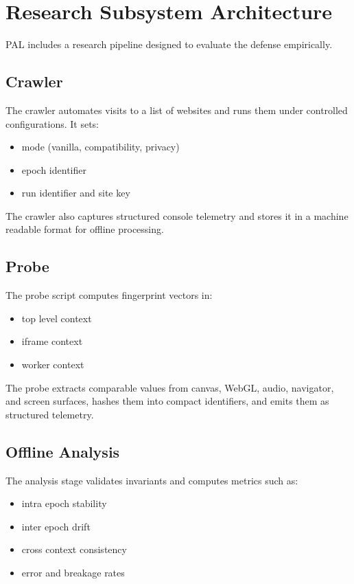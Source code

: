 \documentclass[11pt]{report}
\begin{document}
\section{Research Subsystem Architecture}

PAL includes a research pipeline designed to evaluate the defense empirically.

\subsection{Crawler}

The crawler automates visits to a list of websites and runs them under controlled configurations. It sets:

\begin{itemize}
    \item mode (vanilla, compatibility, privacy)
    \item epoch identifier
    \item run identifier and site key
\end{itemize}

The crawler also captures structured console telemetry and stores it in a machine readable format for offline processing.

\subsection{Probe}

The probe script computes fingerprint vectors in:

\begin{itemize}
    \item top level context
    \item iframe context
    \item worker context
\end{itemize}

The probe extracts comparable values from canvas, WebGL, audio, navigator, and screen surfaces, hashes them into compact identifiers, and emits them as structured telemetry.

\subsection{Offline Analysis}

The analysis stage validates invariants and computes metrics such as:

\begin{itemize}
    \item intra epoch stability
    \item inter epoch drift
    \item cross context consistency
    \item error and breakage rates
\end{itemize}
\end{document}
